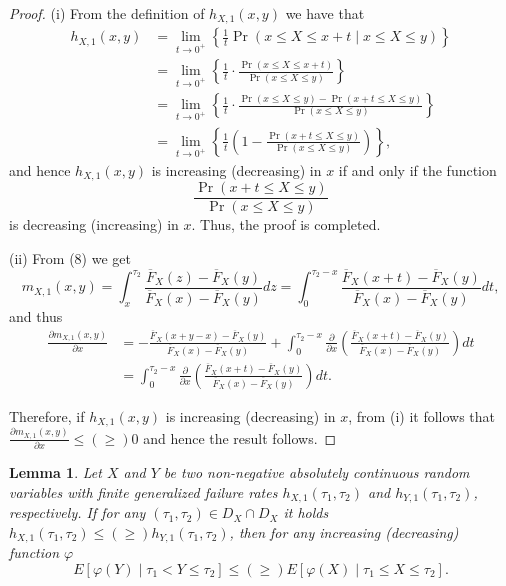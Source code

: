 \documentclass[11pt]{article}
\newtheorem{lemma}{Lemma}
\begin{document}
\begin{proof}
	(i) From the definition of $h_{X,1}(x,y)$ we have that
	\begin{align*}
		h_{X,1}(x,y) & = \textstyle \lim_{t \to 0^+} \left\{ \frac{1}{t} \Pr(x \leq X \leq x+t \mid x \leq X \leq y) \right\} \\
		& = \textstyle \lim_{t \to 0^+} \left\{ \frac{1}{t} \cdot \frac{\Pr(x \leq X \leq x+t)}{\Pr(x \leq X \leq y)} \right\} \\
		& = \textstyle \lim_{t \to 0^+} \left\{ \frac{1}{t} \cdot \frac{\Pr(x \leq X \leq y)-\Pr(x+t \leq X \leq y)}{\Pr(x \leq X \leq y)} \right\} \\
		& = \textstyle \lim_{t \to 0^+} \left\{ \frac{1}{t} \left(1 - \frac{\Pr(x+t \leq X \leq y)}{\Pr(x \leq X \leq y)} \right) \right\},
	\end{align*} 
	and hence $h_{X,1}(x,y)$ is increasing (decreasing) in $x$ if and only if the function 
	$$ \textstyle \frac{\Pr(x+t \leq X \leq y)}{\Pr(x \leq X \leq y)}
	$$
	is decreasing (increasing) in $x$. Thus, the proof is completed.
	
	\noindent (ii) From (8) we get
	$$ \textstyle m_{X,1}(x,y) = \int_x^{\tau_2} \frac{\overline{F}_X(z)-\overline{F}_X(y)}{\overline{F}_X(x)-\overline{F}_X(y)} dz = \int_0^{\tau_2 - x} \frac{\overline{F}_X(x+t)-\overline{F}_X(y)}{\overline{F}_X(x)-\overline{F}_X(y)} dt, $$
	and thus
	\begin{align*}
		\frac{\partial m_{X,1}(x,y)}{\partial x} & = \textstyle -\frac{\overline{F}_X(x+y-x)-\overline{F}_X(y)}{\overline{F}_X(x)-\overline{F}_X(y)} + \int_0^{\tau_2 - x} \frac{\partial}{\partial x} \left( \frac{\overline{F}_X(x+t)-\overline{F}_X(y)}{\overline{F}_X(x)-\overline{F}_X(y)} \right) dt \\
		& = \textstyle \int_0^{\tau_2 - x} \frac{\partial}{\partial x} \left( \frac{\overline{F}_X(x+t)-\overline{F}_X(y)}{\overline{F}_X(x)-\overline{F}_X(y)} \right) dt.
	\end{align*}
	
	Therefore, if $h_{X,1}(x,y)$ is increasing (decreasing) in $x$, from (i) it follows that $ \frac{\partial m_{X,1}(x,y)}{\partial x} \leq (\geq) 0 $ and hence the result follows.
\end{proof}

 
\begin{lemma}
	Let $X$ and $Y$ be two non-negative absolutely continuous random variables with finite generalized failure rates $h_{X,1}(\tau_1,\tau_2)$ and $h_{Y,1}(\tau_1,\tau_2)$, respectively. If for any $(\tau_1,\tau_2)\in D_X\cap D_X$ it holds $h_{X,1}(\tau_1,\tau_2)\leq (\geq) h_{Y,1}(\tau_1,\tau_2)$, then for any increasing (decreasing) function $\varphi$
	\begin{equation}
		E[\varphi(Y) \mid \tau_1 < Y \leq \tau_2 ] \leq (\geq) E[\varphi(X) \mid \tau_1 \leq X \leq \tau_2].
	\end{equation}
\end{lemma}
\end{document}
